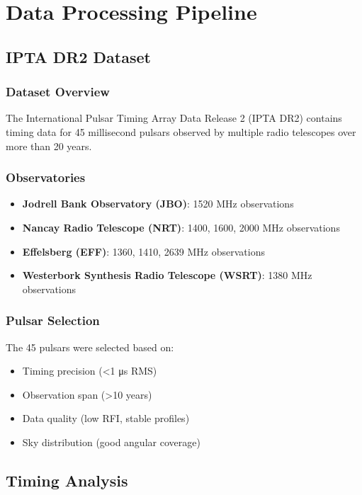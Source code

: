 \section{Data Processing Pipeline}

\subsection{IPTA DR2 Dataset}

\subsubsection{Dataset Overview}
The International Pulsar Timing Array Data Release 2 (IPTA DR2) contains timing data for 45 millisecond pulsars observed by multiple radio telescopes over more than 20 years.

\subsubsection{Observatories}
\begin{itemize}
    \item \textbf{Jodrell Bank Observatory (JBO)}: 1520 MHz observations
    \item \textbf{Nancay Radio Telescope (NRT)}: 1400, 1600, 2000 MHz observations
    \item \textbf{Effelsberg (EFF)}: 1360, 1410, 2639 MHz observations
    \item \textbf{Westerbork Synthesis Radio Telescope (WSRT)}: 1380 MHz observations
\end{itemize}

\subsubsection{Pulsar Selection}
The 45 pulsars were selected based on:
\begin{itemize}
    \item Timing precision (<1 μs RMS)
    \item Observation span (>10 years)
    \item Data quality (low RFI, stable profiles)
    \item Sky distribution (good angular coverage)
\end{itemize}

\subsection{Timing Analysis}

